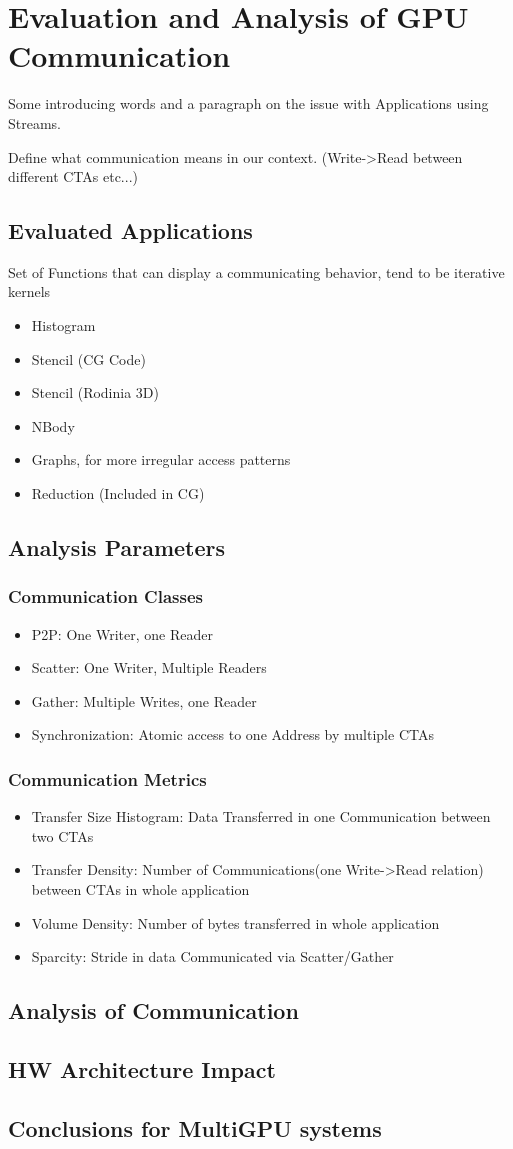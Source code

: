\chapter{Evaluation and Analysis of GPU Communication}
Some introducing words and a paragraph on the issue with Applications using Streams. 

Define what communication means in our context. (Write->Read between different CTAs etc...)
\section{Evaluated Applications}
	Set of Functions that can display a communicating behavior, tend to be iterative kernels
\begin{itemize}
	\item Histogram
	\item Stencil (CG Code)
	\item Stencil (Rodinia 3D)
	\item NBody
	\item Graphs, for more irregular access patterns
	\item Reduction (Included in CG)
\end{itemize}
\section{Analysis Parameters}
\subsection{Communication Classes}
\begin{itemize}
	\item P2P: One Writer, one Reader
	\item Scatter: One Writer, Multiple Readers
	\item Gather: Multiple Writes, one Reader
	\item Synchronization: Atomic access to one Address by multiple CTAs
\end{itemize}
\subsection{Communication Metrics}
\begin{itemize}
	\item Transfer Size Histogram: Data Transferred in one Communication between two CTAs
	\item Transfer Density: Number of Communications(one Write->Read relation) between CTAs in whole application
	\item Volume Density: Number of bytes transferred in whole application
	\item Sparcity: Stride in data Communicated via Scatter/Gather
\end{itemize}
\section{Analysis of Communication}
\section{HW Architecture Impact}
\section{Conclusions for MultiGPU systems}